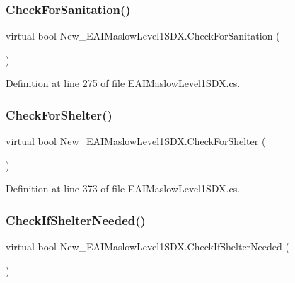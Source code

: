 \subsubsection{\texorpdfstring{CheckForSanitation()}{CheckForSanitation()}}
{\footnotesize\ttfamily virtual bool New\+\_\+\+E\+A\+I\+Maslow\+Level1\+S\+D\+X.\+Check\+For\+Sanitation (\begin{DoxyParamCaption}{ }\end{DoxyParamCaption})\hspace{0.3cm}{\ttfamily [virtual]}}



Definition at line 275 of file E\+A\+I\+Maslow\+Level1\+S\+D\+X.\+cs.

\mbox{\label{class_new___e_a_i_maslow_level1_s_d_x_ab0e37971339c778c4b771865faba3b20}} 
\subsubsection{\texorpdfstring{CheckForShelter()}{CheckForShelter()}}
{\footnotesize\ttfamily virtual bool New\+\_\+\+E\+A\+I\+Maslow\+Level1\+S\+D\+X.\+Check\+For\+Shelter (\begin{DoxyParamCaption}{ }\end{DoxyParamCaption})\hspace{0.3cm}{\ttfamily [virtual]}}



Definition at line 373 of file E\+A\+I\+Maslow\+Level1\+S\+D\+X.\+cs.

\mbox{\label{class_new___e_a_i_maslow_level1_s_d_x_a2b1a6463d17b5a38a9926ed643fe386b}} 
\subsubsection{\texorpdfstring{CheckIfShelterNeeded()}{CheckIfShelterNeeded()}}
{\footnotesize\ttfamily virtual bool New\+\_\+\+E\+A\+I\+Maslow\+Level1\+S\+D\+X.\+Check\+If\+Shelter\+Needed (\begin{DoxyParamCaption}{ }\end{DoxyParamCaption})\hspace{0.3cm}{\ttfamily [virtual]}}




